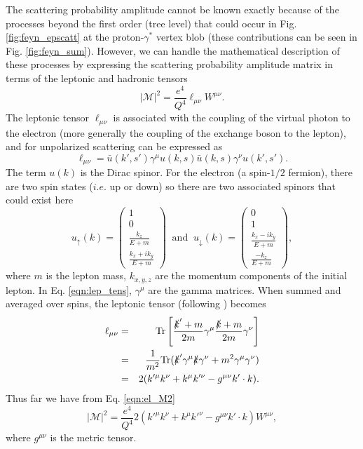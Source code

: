 The scattering probability amplitude cannot be known exactly because of the processes beyond the first order (tree level) that could occur in Fig. \ref{fig:feyn_epscatt} at the proton-$\gamma^{*}$ vertex blob (these contributions can be seen in Fig. \ref{fig:feyn_sum}). However, we can handle the mathematical description of these processes by expressing the scattering probability amplitude matrix in terms of the leptonic and hadronic tensors
\begin{equation}
\label{eqn:el_M2}
|\mathcal{M}|^2 = \frac{e^4}{Q^4} \ell_{\mu\nu} W^{\mu \nu}.
\end{equation}
The leptonic tensor $\ell_{\mu\nu}$ is associated with the coupling of the virtual photon to the electron (more generally the coupling of the exchange boson to the lepton), and for unpolarized scattering can be expressed as
\begin{equation}
\label{eqn:lep_tens}
\ell_{\mu\nu} = \bar{u}(k',s')\gamma^{\mu}u(k,s) \bar{u}(k,s) \gamma^{\nu} u(k',s').
\end{equation}
The term $u(k)$ is the Dirac spinor. For the electron (a spin-$1/2$ fermion), there are two spin states ($i.e.$ up or down) so there are two associated spinors that could exist here
\begin{equation}
u_{\uparrow}(k) = \left( \begin{array}{c} 1 \\ 0 \\ \frac{k_z}{E+m} \\ \frac{k_x+ik_y}{E+m} \end{array} \right) \; \; \mathrm{and} \; \;
u_{\downarrow}(k) = \left( \begin{array}{c} 0 \\ 1 \\ \frac{k_x-ik_y}{E+m} \\ \frac{-k_z}{E+m} \end{array} \right),
\end{equation}
where $m$ is the lepton mass, $k_{x,y,z}$ are the momentum components of the initial lepton. In Eq. \ref{eqn:lep_tens}, $\gamma^{\mu}$ are the gamma matrices. When summed and averaged over spins, the leptonic tensor (following \cite{book:bjorken_drell}) becomes
\begin{eqnarray}
\nonumber
\ell_{\mu\nu} &=& \mathrm{Tr} \left[ \frac{\slashed{k}'+m}{2m} \gamma^{\mu} \frac{\slashed{k}+m}{2m} \gamma^{\nu} \right] \\
\nonumber
&=& \frac{1}{m^2} \mathrm{Tr} (\slashed{k}'\gamma^{\mu}\slashed{k}\gamma^{\nu} + m^2\gamma^{\mu}\gamma^{\nu}) \\
&=& 2 (k'^{\mu}k^{\nu} + k^{\mu}k'^{\nu} - g^{\mu\nu}k' \cdot k).
\end{eqnarray}
Thus far we have from Eq. \ref{eqn:el_M2}
\begin{equation}
|\mathcal{M}|^2 = \frac{e^4}{Q^4} 2 (k'^{\mu}k^{\nu} + k^{\mu}k'^{\nu} - g^{\mu\nu}k' \cdot k) W^{\mu \nu},
\end{equation}
where $g^{\mu\nu}$ is the metric tensor.

